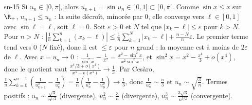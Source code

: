 \begin{corrige}{sn-15}
 Si $u_n\in\,]0,\pi[$, alors $u_{n+1}=\sin u_n\in\,]0,1]\subset\,]0,\pi[$. Comme $\sin x\leq x$ sur $\R_+$, $u_{n+1}\leq u_n$ : la suite décroît,
minorée par $0$, elle converge vers $\ell\in[0,1]$ avec $\sin\ell=\ell$, soit $\ell=0$.
 Soit $\varepsilon>0$ et $N$ tel que $|x_k-\ell|\leq\varepsilon$ pour $k>N$. Pour $n>N$ :
$\left|\frac1n\sum_{k=1}^n(x_k-\ell)\right|\leq\frac1n\sum_{k=1}^N|x_k-\ell|+\frac{n-N}n\varepsilon$. Le premier terme tend vers $0$ ($N$ fixé), donc
il est $\leq\varepsilon$ pour $n$ grand : la moyenne est à moins de $2\varepsilon$ de $\ell$.
 Avec $x=u_n\to0$ : $\frac1{\sin^2x}-\frac1{x^2}=\frac{x^2-\sin^2x}{x^2\sin^2x}$, et $\sin^2x=x^2-\frac{x^4}3+o(x^4)$, donc le quotient vaut
$\frac{x^4/3+o(x^4)}{x^4+o(x^4)}\to\frac13$. Par Cesàro, $\frac1n\sum_{k=0}^{n-1}\left(\frac1{u_{k+1}^2}-\frac1{u_k^2}\right)=\frac1n\left(\frac1{u_n^2}-\frac1{u_0^2}\right)\to\frac13$,
donc $\frac1{u_n^2}\sim\frac n3$ et $u_n\sim\sqrt{\frac3n}$.
 Termes positifs : $u_n\sim\frac{\sqrt3}{n^{1/2}}$ (divergente), $u_n^2\sim\frac3n$ (divergente), $u_n^3\sim\frac{3\sqrt3}{n^{3/2}}$ (convergente).
\end{corrige}
